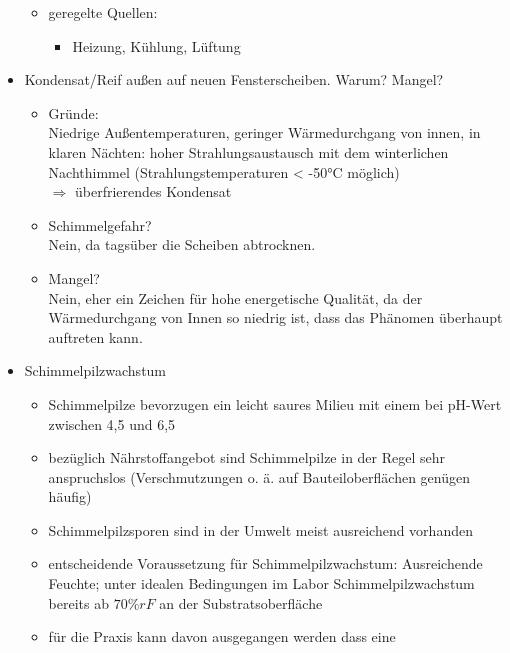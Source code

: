 \documentclass[fleqn,twoside,dvipsnames]{article}
\begin{document}
\begin{itemize}
\begin{itemize}
\begin{itemize}
                        \end{itemize}
                    \item geregelte Quellen:
                        \begin{itemize}
                            \item Heizung, Kühlung, Lüftung
                        \end{itemize}
                \end{itemize}
            \item Kondensat/Reif außen auf neuen Fensterscheiben. Warum? Mangel?
                \begin{itemize}
                    \item Gründe:\\
                        Niedrige Außentemperaturen,  geringer Wärmedurchgang von innen, in klaren Nächten: hoher Strahlungsaustausch mit dem winterlichen Nachthimmel (Strahlungstemperaturen < -50°C möglich)\\
                        $\Rightarrow$ überfrierendes Kondensat
                    \item Schimmelgefahr?\\
                    Nein, da tagsüber die Scheiben abtrocknen.
                    \item Mangel?\\
                    Nein, eher ein Zeichen für hohe energetische Qualität, da der Wärmedurchgang von Innen so niedrig ist, dass das Phänomen überhaupt auftreten kann.
                \end{itemize}
            \item Schimmelpilzwachstum
                \begin{itemize}
                    \item Schimmelpilze bevorzugen ein leicht saures Milieu mit einem bei $\mathrm{pH}$-Wert zwischen 4,5 und 6,5
                     \item bezüglich Nährstoffangebot sind Schimmelpilze in der Regel sehr anspruchslos (Verschmutzungen o. ä. auf Bauteiloberflächen genügen häufig)
                    \item Schimmelpilzsporen sind in der Umwelt meist ausreichend vorhanden
                    \item entscheidende Voraussetzung für Schimmelpilzwachstum:
                    Ausreichende Feuchte; unter idealen Bedingungen im Labor Schimmelpilzwachstum bereits ab $70 \% r F$ an der
                    Substratsoberfläche
                    \item für die Praxis kann davon ausgegangen werden dass eine

\end{itemize}
\end{itemize}
\end{document}

